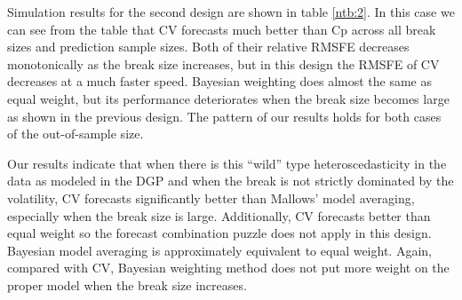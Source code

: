 Simulation results for the second design are shown in table \ref{ntb:2}. In this case we can see from the table that CV forecasts much better than Cp across all break sizes and prediction sample sizes. Both of their relative RMSFE decreases monotonically as the break size increases, but in this design the RMSFE of CV decreases at a much faster speed. Bayesian weighting does almost the same as equal weight, but its performance deteriorates when the break size becomes large as shown in the previous design. The pattern of our results holds for both cases of the out-of-sample size.

Our results indicate that when there is this ``wild'' type heteroscedasticity in the data as modeled in the DGP and when the break is not strictly dominated by the volatility, CV forecasts significantly better than Mallows' model averaging, especially when the break size is large. Additionally, CV forecasts better than equal weight so the forecast combination puzzle does not apply in this design. Bayesian model averaging is approximately equivalent to equal weight. Again, compared with CV, Bayesian weighting method does not put more weight on the proper model when the break size increases.

